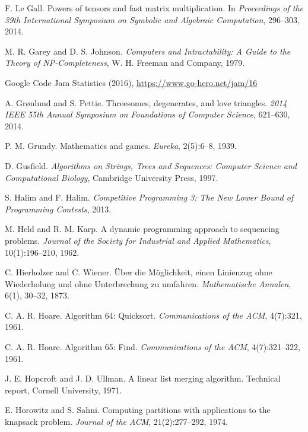 \begin{thebibliography}{9}
  F. Le Gall.
  Powers of tensors and fast matrix multiplication.
  In \emph{Proceedings of the 39th International Symposium on Symbolic and Algebraic Computation},
  296--303, 2014.

  M. R. Garey and D. S. Johnson.
  \emph{Computers and Intractability:
  A Guide to the Theory of NP-Completeness},
  W. H. Freeman and Company, 1979.

  Google Code Jam Statistics (2016),
  \url{https://www.go-hero.net/jam/16}

  A. Grønlund and S. Pettie.
  Threesomes, degenerates, and love triangles.
  \emph{2014 IEEE 55th Annual Symposium on Foundations of Computer Science},
  621--630, 2014.

  P. M. Grundy.
  Mathematics and games.
  \emph{Eureka}, 2(5):6--8, 1939.

  D. Gusfield.
  \emph{Algorithms on Strings, Trees and Sequences:
  Computer Science and Computational Biology},
  Cambridge University Press, 1997.


  S. Halim and F. Halim.
  \emph{Competitive Programming 3: The New Lower Bound of Programming Contests}, 2013.

  M. Held and R. M. Karp.
  A dynamic programming approach to sequencing problems.
  \emph{Journal of the Society for Industrial and Applied Mathematics}, 10(1):196--210, 1962.

  C. Hierholzer and C. Wiener.
  Über die Möglichkeit, einen Linienzug ohne Wiederholung und ohne Unterbrechung zu umfahren.
  \emph{Mathematische Annalen}, 6(1), 30--32, 1873.

  C. A. R. Hoare.
  Algorithm 64: Quicksort.
  \emph{Communications of the ACM}, 4(7):321, 1961.

  C. A. R. Hoare.
  Algorithm 65: Find.
  \emph{Communications of the ACM}, 4(7):321--322, 1961.

  J. E. Hopcroft and J. D. Ullman.
  A linear list merging algorithm.
  Technical report, Cornell University, 1971.

  E. Horowitz and S. Sahni.
  Computing partitions with applications to the knapsack problem.
  \emph{Journal of the ACM}, 21(2):277--292, 1974.


\end{thebibliography}
